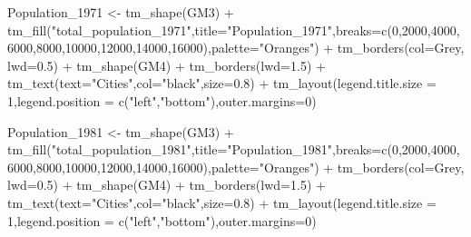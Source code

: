 \documentclass[
]{article}
\newenvironment{Shaded}{\begin{snugshade}}{\end{snugshade}}
\newcommand{\AttributeTok}[1]{\textcolor[rgb]{0.77,0.63,0.00}{#1}}
\newcommand{\DecValTok}[1]{\textcolor[rgb]{0.00,0.00,0.81}{#1}}
\newcommand{\FloatTok}[1]{\textcolor[rgb]{0.00,0.00,0.81}{#1}}
\newcommand{\FunctionTok}[1]{\textcolor[rgb]{0.00,0.00,0.00}{#1}}
\newcommand{\NormalTok}[1]{#1}
\newcommand{\OtherTok}[1]{\textcolor[rgb]{0.56,0.35,0.01}{#1}}
\newcommand{\SpecialCharTok}[1]{\textcolor[rgb]{0.00,0.00,0.00}{#1}}
\newcommand{\StringTok}[1]{\textcolor[rgb]{0.31,0.60,0.02}{#1}}
\begin{document}
\begin{Shaded}
\begin{Highlighting}[]
\NormalTok{Population\_1971 }\OtherTok{\textless{}{-}} \FunctionTok{tm\_shape}\NormalTok{(GM3) }\SpecialCharTok{+}
  \FunctionTok{tm\_fill}\NormalTok{(}\StringTok{"total\_population\_1971"}\NormalTok{,}\AttributeTok{title=}\StringTok{"Population\_1971"}\NormalTok{,}\AttributeTok{breaks=}\FunctionTok{c}\NormalTok{(}\DecValTok{0}\NormalTok{,}\DecValTok{2000}\NormalTok{,}\DecValTok{4000}\NormalTok{,}\DecValTok{6000}\NormalTok{,}\DecValTok{8000}\NormalTok{,}\DecValTok{10000}\NormalTok{,}\DecValTok{12000}\NormalTok{,}\DecValTok{14000}\NormalTok{,}\DecValTok{16000}\NormalTok{),}\AttributeTok{palette=}\StringTok{"Oranges"}\NormalTok{) }\SpecialCharTok{+}
 \FunctionTok{tm\_borders}\NormalTok{(}\AttributeTok{col=}\StringTok{\textquotesingle{}Grey\textquotesingle{}}\NormalTok{, }\AttributeTok{lwd=}\FloatTok{0.5}\NormalTok{) }\SpecialCharTok{+}
\FunctionTok{tm\_shape}\NormalTok{(GM4) }\SpecialCharTok{+}
  \FunctionTok{tm\_borders}\NormalTok{(}\AttributeTok{lwd=}\FloatTok{1.5}\NormalTok{) }\SpecialCharTok{+}
  \FunctionTok{tm\_text}\NormalTok{(}\AttributeTok{text=}\StringTok{"Cities"}\NormalTok{,}\AttributeTok{col=}\StringTok{"black"}\NormalTok{,}\AttributeTok{size=}\FloatTok{0.8}\NormalTok{) }\SpecialCharTok{+}
\FunctionTok{tm\_layout}\NormalTok{(}\AttributeTok{legend.title.size =} \DecValTok{1}\NormalTok{,}\AttributeTok{legend.position =} \FunctionTok{c}\NormalTok{(}\StringTok{"left"}\NormalTok{,}\StringTok{"bottom"}\NormalTok{),}\AttributeTok{outer.margins=}\DecValTok{0}\NormalTok{)}

\NormalTok{Population\_1981 }\OtherTok{\textless{}{-}} \FunctionTok{tm\_shape}\NormalTok{(GM3) }\SpecialCharTok{+}
  \FunctionTok{tm\_fill}\NormalTok{(}\StringTok{"total\_population\_1981"}\NormalTok{,}\AttributeTok{title=}\StringTok{"Population\_1981"}\NormalTok{,}\AttributeTok{breaks=}\FunctionTok{c}\NormalTok{(}\DecValTok{0}\NormalTok{,}\DecValTok{2000}\NormalTok{,}\DecValTok{4000}\NormalTok{,}\DecValTok{6000}\NormalTok{,}\DecValTok{8000}\NormalTok{,}\DecValTok{10000}\NormalTok{,}\DecValTok{12000}\NormalTok{,}\DecValTok{14000}\NormalTok{,}\DecValTok{16000}\NormalTok{),}\AttributeTok{palette=}\StringTok{"Oranges"}\NormalTok{) }\SpecialCharTok{+}
 \FunctionTok{tm\_borders}\NormalTok{(}\AttributeTok{col=}\StringTok{\textquotesingle{}Grey\textquotesingle{}}\NormalTok{, }\AttributeTok{lwd=}\FloatTok{0.5}\NormalTok{) }\SpecialCharTok{+}
\FunctionTok{tm\_shape}\NormalTok{(GM4) }\SpecialCharTok{+}
  \FunctionTok{tm\_borders}\NormalTok{(}\AttributeTok{lwd=}\FloatTok{1.5}\NormalTok{) }\SpecialCharTok{+}
  \FunctionTok{tm\_text}\NormalTok{(}\AttributeTok{text=}\StringTok{"Cities"}\NormalTok{,}\AttributeTok{col=}\StringTok{"black"}\NormalTok{,}\AttributeTok{size=}\FloatTok{0.8}\NormalTok{) }\SpecialCharTok{+}
\FunctionTok{tm\_layout}\NormalTok{(}\AttributeTok{legend.title.size =} \DecValTok{1}\NormalTok{,}\AttributeTok{legend.position =} \FunctionTok{c}\NormalTok{(}\StringTok{"left"}\NormalTok{,}\StringTok{"bottom"}\NormalTok{),}\AttributeTok{outer.margins=}\DecValTok{0}\NormalTok{)}


\end{Highlighting}
\end{Shaded}
\end{document}
